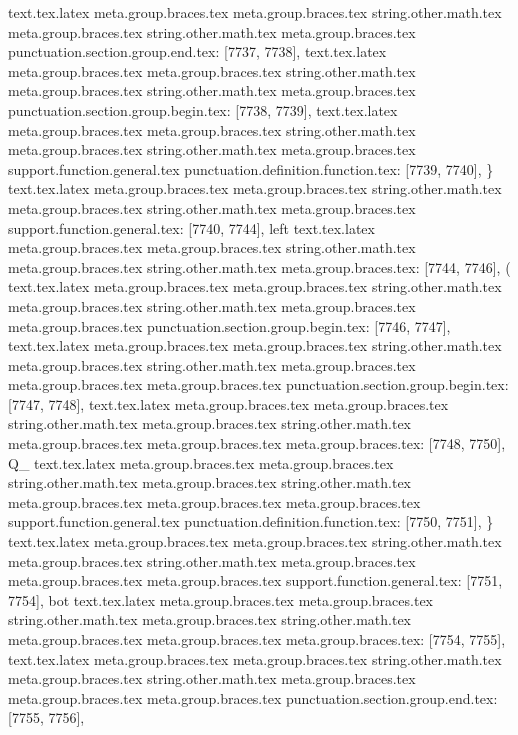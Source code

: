 {{{{{{{{{{{{{{{{{{{{{{{{{{{{{{{{{{{{{{{{{{{{{{{{{{{{{{{{{{{{{{{{{{{{{{{{{{{{{{{{{{{{{{{{{{{{{{{{{{{{{{{{{{{{{{{{{{{{{{{{{{{{{{{{{{{{{{{{{{{{{{{{{{{{{{{{{{{{{{{{{{{{{{{{{{{{{{{{{{{{{{{{{{{{{{{{{{{{{{{{{{{{{{{{{{{{{{{{{{{{{{{{text.tex.latex meta.group.braces.tex meta.group.braces.tex string.other.math.tex meta.group.braces.tex string.other.math.tex meta.group.braces.tex punctuation.section.group.end.tex: [7737, 7738], {}}
text.tex.latex meta.group.braces.tex meta.group.braces.tex string.other.math.tex meta.group.braces.tex string.other.math.tex meta.group.braces.tex punctuation.section.group.begin.tex: [7738, 7739], {{}
text.tex.latex meta.group.braces.tex meta.group.braces.tex string.other.math.tex meta.group.braces.tex string.other.math.tex meta.group.braces.tex support.function.general.tex punctuation.definition.function.tex: [7739, 7740], {\}
text.tex.latex meta.group.braces.tex meta.group.braces.tex string.other.math.tex meta.group.braces.tex string.other.math.tex meta.group.braces.tex support.function.general.tex: [7740, 7744], {left}
text.tex.latex meta.group.braces.tex meta.group.braces.tex string.other.math.tex meta.group.braces.tex string.other.math.tex meta.group.braces.tex: [7744, 7746], {( }
text.tex.latex meta.group.braces.tex meta.group.braces.tex string.other.math.tex meta.group.braces.tex string.other.math.tex meta.group.braces.tex meta.group.braces.tex punctuation.section.group.begin.tex: [7746, 7747], {{}
text.tex.latex meta.group.braces.tex meta.group.braces.tex string.other.math.tex meta.group.braces.tex string.other.math.tex meta.group.braces.tex meta.group.braces.tex meta.group.braces.tex punctuation.section.group.begin.tex: [7747, 7748], {{}
text.tex.latex meta.group.braces.tex meta.group.braces.tex string.other.math.tex meta.group.braces.tex string.other.math.tex meta.group.braces.tex meta.group.braces.tex meta.group.braces.tex: [7748, 7750], {Q_}
text.tex.latex meta.group.braces.tex meta.group.braces.tex string.other.math.tex meta.group.braces.tex string.other.math.tex meta.group.braces.tex meta.group.braces.tex meta.group.braces.tex support.function.general.tex punctuation.definition.function.tex: [7750, 7751], {\}
text.tex.latex meta.group.braces.tex meta.group.braces.tex string.other.math.tex meta.group.braces.tex string.other.math.tex meta.group.braces.tex meta.group.braces.tex meta.group.braces.tex support.function.general.tex: [7751, 7754], {bot}
text.tex.latex meta.group.braces.tex meta.group.braces.tex string.other.math.tex meta.group.braces.tex string.other.math.tex meta.group.braces.tex meta.group.braces.tex meta.group.braces.tex: [7754, 7755], { }
text.tex.latex meta.group.braces.tex meta.group.braces.tex string.other.math.tex meta.group.braces.tex string.other.math.tex meta.group.braces.tex meta.group.braces.tex meta.group.braces.tex punctuation.section.group.end.tex: [7755, 7756], {}}
}}}}}}}}}}}}}}}}}}}}}}}}}}}}}}}}}}}}}}}}}}}}}}}}}}}}}}}}}}}}}}}}}}}}}}}}}}}}}}}}}}}}}}}}}}}}}}}}}}}}}}}}}}}}}}}}}}}}}}}}}}}}}}}}}}}}}}}}}}}}}}}}}}}}}}}}}}}}}}}}}}}}}}}}}}}}}}}}}}}}}}}}}}}}}}}}}}}}}}}}}}}}}}}}}}}}}}}}}}}}}}}}}}}
